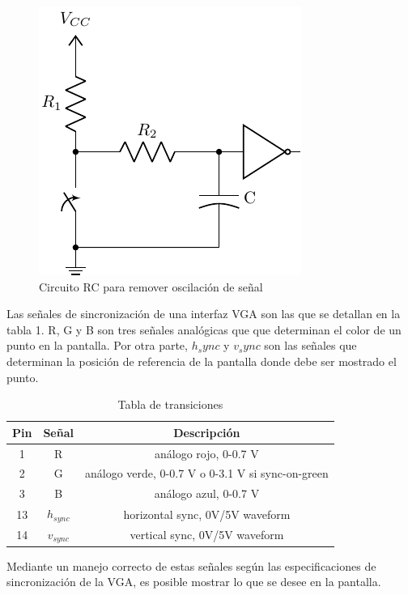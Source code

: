 \documentclass[journal,trans]{IEEEtran}
\begin{document}
	\begin{figure}[h]
		\centering
		\includegraphics[scale=0.8]{imagenes/rc_debouncer.pdf}
		\caption{Circuito RC para remover oscilación de señal}
		\label{fig:tikz-debouncer}
	\end{figure}
	
	Las señales de sincronización de una interfaz VGA son las que se detallan en la tabla 1. R, G y B son tres señales analógicas que que determinan el color de un punto en la pantalla. Por otra parte, $h_sync$ y $v_sync$ son las señales que determinan la posición de referencia de la pantalla donde debe ser mostrado el punto.
	
	\begin{table}[h]
		\centering
		\begin{tabular}{||c|c|c||}
			\hline
			\hline
			Pin & Señal       & Descripción \\
			\hline
			1   & R           & análogo rojo, 0-0.7 V\\
			2   & G           & análogo verde, 0-0.7 V o 0-3.1 V si sync-on-green \\
			3   & B           & análogo azul, 0-0.7 V\\
			13  & $h_{sync}$  & horizontal sync, 0V/5V waveform\\
			14  & $v_{sync}$  & vertical sync, 0V/5V waveform\\
			\hline
			\hline
		\end{tabular}
		\caption{Tabla de transiciones}
		\label{tab:VGA}
	\end{table}
	
	Mediante un manejo correcto de estas señales según las especificaciones de sincronización de la VGA, es posible mostrar lo que se desee en la pantalla. 
	
\end{document}
